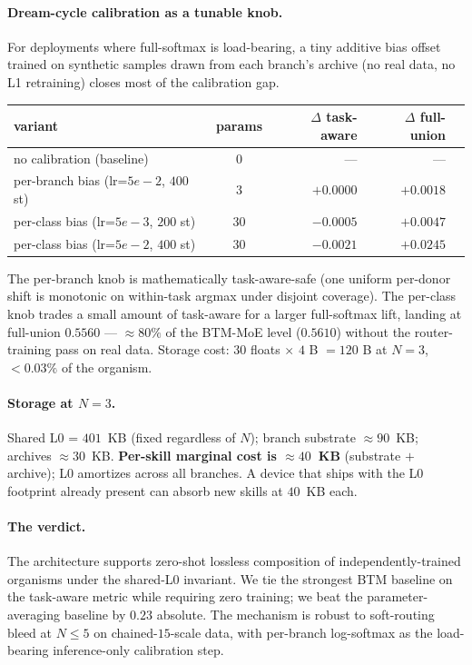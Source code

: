 \documentclass[11pt]{article}
\begin{document}
\paragraph{Dream-cycle calibration as a tunable knob.}
For deployments where full-softmax is load-bearing, a tiny additive
bias offset trained on synthetic samples drawn from each branch's
archive (no real data, no L1 retraining) closes most of the
calibration gap.

\begin{center}
\begin{tabular}{lcrrr}
\toprule
variant & params & $\Delta$ task-aware & $\Delta$ full-union \\
\midrule
no calibration (baseline) & $0$ & --- & --- \\
per-branch bias (lr=$5e\!-\!2$, $400$ st) & $3$ & $+0.0000$ & $+0.0018$ \\
per-class bias (lr=$5e\!-\!3$, $200$ st) & $30$ & $-0.0005$ & $+0.0047$ \\
per-class bias (lr=$5e\!-\!2$, $400$ st) & $30$ & $-0.0021$ & $+0.0245$ \\
\bottomrule
\end{tabular}
\end{center}

The per-branch knob is mathematically task-aware-safe (one uniform
per-donor shift is monotonic on within-task argmax under disjoint
coverage). The per-class knob trades a small amount of task-aware for
a larger full-softmax lift, landing at full-union $0.5560$ ---
$\approx 80\%$ of the BTM-MoE level ($0.5610$) without the
router-training pass on real data. Storage cost: $30$ floats $\times$
$4$ B $= 120$ B at $N = 3$, $<\!0.03\%$ of the organism.

\paragraph{Storage at $N = 3$.}
Shared L0 = $401$~KB (fixed regardless of $N$); branch substrate
$\approx 90$~KB; archives $\approx 30$~KB. \textbf{Per-skill marginal
cost is $\approx 40$~KB} (substrate $+$ archive); L0 amortizes across
all branches. A device that ships with the L0 footprint already
present can absorb new skills at $40$~KB each.

\paragraph{The verdict.} The architecture supports zero-shot lossless
composition of independently-trained organisms under the shared-L0
invariant. We tie the strongest BTM baseline on the task-aware metric
while requiring zero training; we beat the parameter-averaging baseline
by $0.23$ absolute. The mechanism is robust to soft-routing bleed at
$N \leq 5$ on chained-$15$-scale data, with per-branch log-softmax as
the load-bearing inference-only calibration step.
\end{document}
